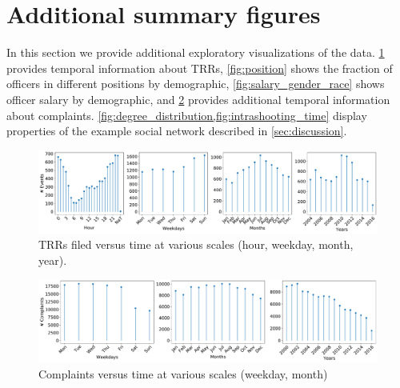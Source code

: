 \section{Additional summary figures}\label{sec:additional_figs}

In this section we provide additional exploratory visualizations 
of the data. \cref{fig:trrs_times} provides temporal information
about TRRs, \cref{fig:position} shows the fraction of officers 
in different positions by demographic, \cref{fig:salary_gender_race}
shows officer salary by demographic, 
and \cref{fig:complaints_times} provides additional temporal information about complaints.
\cref{fig:degree_distribution,fig:intrashooting_time} display properties 
of the example social network described in \cref{sec:discussion}.

\begin{figure}[t!] 
	\includegraphics[width=\textwidth]{figs/trrs_times} 
	\caption{TRRs filed versus time at various scales (hour, weekday, month, year).} \label{fig:trrs_times}
\end{figure}
\begin{figure}[t!]
	\includegraphics[width=\textwidth, clip, trim= 0 0 460 0]{figs/complaints_times} 
\caption{Complaints versus time at various scales (weekday, month)}\label{fig:complaints_times}
\end{figure}

